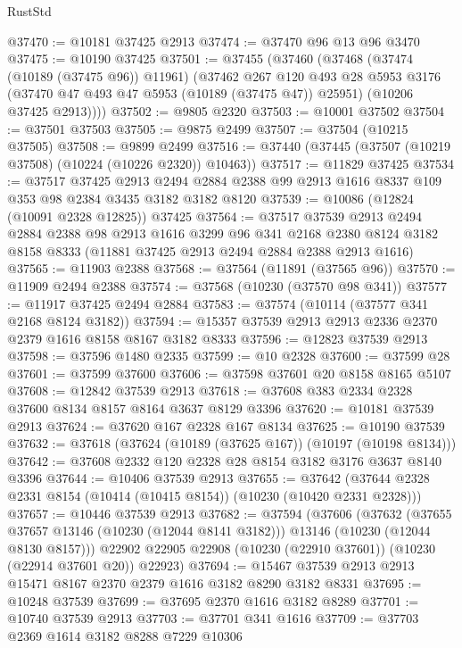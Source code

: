 \begin{lexlean}{RustStd}
\begin{coremodule}
@37470 := @10181 @37425 @2913
@37474 := @37470 @96 @13 @96 @3470
@37475 := @10190 @37425
@37501 := @37455
    (@37460
      (@37468
        (@37474 (@10189 (@37475 @96)) @11961)
        (@37462
          @267
          @120
          @493
          @28
          @5953
          @3176
          (@37470 @47 @493 @47 @5953 (@10189 (@37475 @47)) @25951)
          (@10206 @37425 @2913))))
@37502 := @9805 @2320
@37503 := @10001 @37502
@37504 := @37501 @37503
@37505 := @9875 @2499
@37507 := @37504 (@10215 @37505)
@37508 := @9899 @2499
@37516 := @37440 (@37445 (@37507 (@10219 @37508) (@10224 (@10226 @2320)) @10463))
@37517 := @11829 @37425
@37534 := @37517
    @37425
    @2913
    @2494
    @2884
    @2388
    @99
    @2913
    @1616
    @8337
    @109
    @353
    @98
    @2384
    @3435
    @3182
    @3182
    @8120
@37539 := @10086 (@12824 (@10091 @2328 @12825)) @37425
@37564 := @37517
    @37539
    @2913
    @2494
    @2884
    @2388
    @98
    @2913
    @1616
    @3299
    @96
    @341
    @2168
    @2380
    @8124
    @3182
    @8158
    @8333
    (@11881 @37425 @2913 @2494 @2884 @2388 @2913 @1616)
@37565 := @11903 @2388
@37568 := @37564 (@11891 (@37565 @96))
@37570 := @11909 @2494 @2388
@37574 := @37568 (@10230 (@37570 @98 @341))
@37577 := @11917 @37425 @2494 @2884
@37583 := @37574 (@10114 (@37577 @341 @2168 @8124 @3182))
@37594 := @15357 @37539 @2913 @2913 @2336 @2370 @2379 @1616 @8158 @8167 @3182 @8333
@37596 := @12823 @37539 @2913
@37598 := @37596 @1480 @2335
@37599 := @10 @2328
@37600 := @37599 @28
@37601 := @37599 @37600
@37606 := @37598 @37601 @20 @8158 @8165 @5107
@37608 := @12842 @37539 @2913
@37618 := @37608 @383 @2334 @2328 @37600 @8134 @8157 @8164 @3637 @8129 @3396
@37620 := @10181 @37539 @2913
@37624 := @37620 @167 @2328 @167 @8134
@37625 := @10190 @37539
@37632 := @37618 (@37624 (@10189 (@37625 @167)) (@10197 (@10198 @8134)))
@37642 := @37608 @2332 @120 @2328 @28 @8154 @3182 @3176 @3637 @8140 @3396
@37644 := @10406 @37539 @2913
@37655 := @37642 (@37644 @2328 @2331 @8154 (@10414 (@10415 @8154)) (@10230 (@10420 @2331 @2328)))
@37657 := @10446 @37539 @2913
@37682 := @37594
    (@37606
      (@37632
        (@37655 @37657 @13146 (@10230 (@12044 @8141 @3182)))
        @13146
        (@10230 (@12044 @8130 @8157)))
      @22902
      @22905
      @22908
      (@10230 (@22910 @37601))
      (@10230 (@22914 @37601 @20))
      @22923)
@37694 := @15467 @37539 @2913 @2913 @15471 @8167 @2370 @2379 @1616 @3182 @8290 @3182 @8331
@37695 := @10248 @37539
@37699 := @37695 @2370 @1616 @3182 @8289
@37701 := @10740 @37539 @2913
@37703 := @37701 @341 @1616
@37709 := @37703 @2369 @1614 @3182 @8288 @7229 @10306

\end{coremodule}
\end{lexlean}
